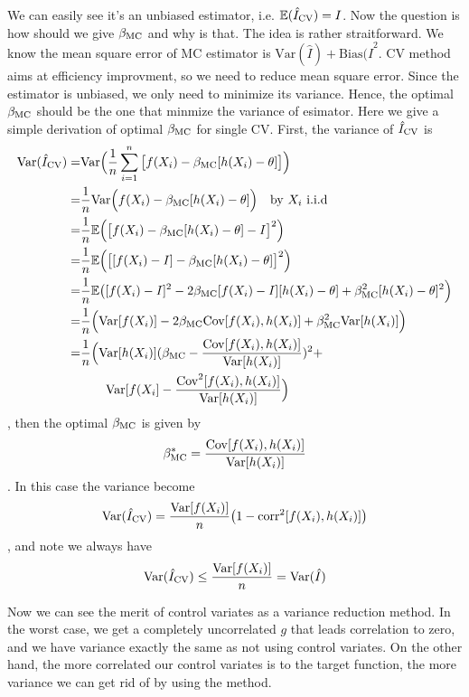 We can easily see it's an unbiased estimator, i.e. $\mathbb{E}(\hat{I}_{\mathrm{CV}}) = I$.
Now the question is how should we give $\beta_{\mathrm{MC}}$ and why is that.
The idea is rather straitforward. 
We know the mean square error of MC estimator is $\mathrm{Var}(\hat{I})+\mathrm{Bias}(\hat{I}^2$\cite{}. 
CV method aims at efficiency improvment, so we need to reduce mean square error. 
Since the estimator is unbiased, we only need to minimize its variance.
Hence, the optimal $\beta_{\mathrm{MC}}$ should be the one that minmize the variance of esimator.
Here we give a simple derivation of optimal $\beta_{\mathrm{MC}}$ for single CV.
First, the variance of $\hat{I}_{\mathrm{CV}}$ is 
\begin{align*}
	\mathrm{Var}(\hat{I}_{\mathrm{CV}})
    =&\mathrm{Var}\Big( \frac{1}{n}\sum_{i=1}^{n}\big[ f(X_i)-\beta_{\mathrm{MC}}[h(X_i)-\theta] \big]\Big)\\
    =&\frac{1}{n}\mathrm{Var}\Big(f(X_i)-\beta_{\mathrm{MC}}[h(X_i)-\theta]\Big)\quad \text{by $X_i$ i.i.d} \\
    =&\frac{1}{n}\mathbb{E}\Big(\big[f(X_i)-\beta_{\mathrm{MC}}[h(X_i)-\theta]-I\big]^2 \Big) \\
    =&\frac{1}{n}\mathbb{E}\Big(\big[ [f(X_i)-I] -\beta_{\mathrm{MC}}[h(X_i)-\theta]\big]^2 \Big) \\
    =&\frac{1}{n}\mathbb{E}\big([f(X_i)-I]^2-2\beta_{\mathrm{MC}}[f(X_i)-I][h(X_i)-\theta]+\beta_{\mathrm{MC}}^2[h(X_i)-\theta]^2 \Big)\\
    =&\frac{1}{n}\Big(\mathrm{Var}[f(X_i)]-2\beta_{\mathrm{MC}}\mathrm{Cov}[f(X_i),h(X_i)]+\beta_{\mathrm{MC}}^2\mathrm{Var}[h(X_i)]\Big)\\
    =&\frac{1}{n}\Big(\mathrm{Var}[h(X_i)](\beta_{\mathrm{MC}}-\frac{\mathrm{Cov}[f(X_i),h(X_i)]}{\mathrm{Var}[h(X_i)]})^2+\\
    &\quad \quad \mathrm{Var}[f(X_i]-\frac{\mathrm{Cov}^2[f(X_i),h(X_i)]}{\mathrm{Var}[h(X_i)]} \Big)
\end{align*},
then the optimal $\beta_{\mathrm{MC}}$ is given by 
\begin{equation}
    \beta_{\mathrm{MC}}^*=\frac{\mathrm{Cov}[f(X_i),h(X_i)]}{\mathrm{Var}[h(X_i)]}
    \label{eq:optBeta}
\end{equation}.
In this case the variance become
\[
    \mathrm{Var}(\hat{I}_{\mathrm{CV}})= \frac{\mathrm{Var}[f(X_i)]}{n}\big(1-\mathrm{corr}^2[f(X_i), h(X_i)]\big) 
\],
and note we always have 
\[
\mathrm{Var}(\hat{I}_{\mathrm{CV}}) \leq \frac{\mathrm{Var}[f(X_i)]}{n}=\mathrm{Var}(\hat{I})
\]

Now we can see the merit of control variates as a variance reduction method. 
In the worst case, we get a completely uncorrelated $g$ that leads correlation to zero, and we have variance exactly the same as not using control variates. On the other hand, the more correlated our control variates is to the target function, the more variance we can get rid of by using the method.

